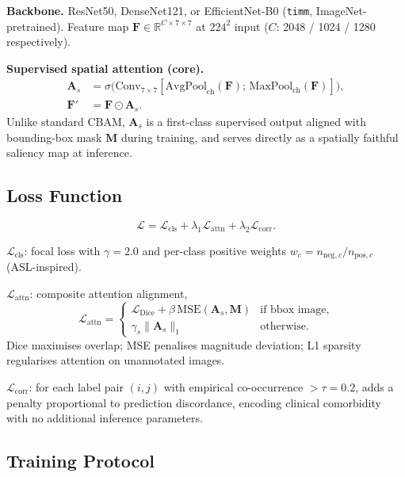 \documentclass[10pt,twocolumn,letterpaper]{article}
\begin{document}
\noindent\textbf{Backbone.} ResNet50, DenseNet121, or EfficientNet-B0 (\texttt{timm},
ImageNet-pretrained). Feature map $\mathbf{F}\!\in\!\mathbb{R}^{C\times 7\times 7}$
at $224^2$ input ($C$: 2048 / 1024 / 1280 respectively).

\noindent\textbf{Supervised spatial attention (core).}
\begin{align}
  \mathbf{A}_s &= \sigma\!\bigl(\text{Conv}_{7\times7}\!
    [\text{AvgPool}_{\text{ch}}(\mathbf{F});\,\text{MaxPool}_{\text{ch}}(\mathbf{F})]\bigr),
    \label{eq:attn}\\
  \mathbf{F}' &= \mathbf{F}\odot\mathbf{A}_s.\label{eq:gate}
\end{align}
Unlike standard CBAM, $\mathbf{A}_s$ is a first-class supervised output aligned with
bounding-box mask $\mathbf{M}$ during training, and serves directly as a spatially
faithful saliency map at inference.

\subsection{Loss Function}

\[
  \mathcal{L} = \mathcal{L}_{\text{cls}}
              + \lambda_1\mathcal{L}_{\text{attn}}
              + \lambda_2\mathcal{L}_{\text{corr}}.
\]

\noindent$\mathcal{L}_{\text{cls}}$: focal loss with $\gamma\!=\!2.0$ and per-class
positive weights $w_c = n_{\text{neg},c}/n_{\text{pos},c}$ (ASL-inspired).

\noindent$\mathcal{L}_{\text{attn}}$: composite attention alignment,
\[
  \mathcal{L}_{\text{attn}} = \begin{cases}
    \mathcal{L}_{\text{Dice}} + \beta\,\text{MSE}(\mathbf{A}_s,\mathbf{M})
      & \text{if bbox image,}\\
    \gamma_s\|\mathbf{A}_s\|_1 & \text{otherwise.}
  \end{cases}
\]
Dice maximises overlap; MSE penalises magnitude deviation; L1 sparsity regularises
attention on unannotated images.

\noindent$\mathcal{L}_{\text{corr}}$: for each label pair $(i,j)$ with empirical
co-occurrence $> \tau=0.2$, adds a penalty proportional to prediction discordance,
encoding clinical comorbidity with no additional inference parameters.

\subsection{Training Protocol}
\end{document}
